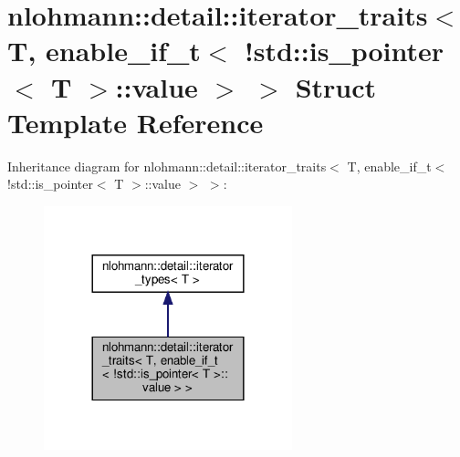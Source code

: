 \hypertarget{structnlohmann_1_1detail_1_1iterator__traits_3_01T_00_01enable__if__t_3_01_9std_1_1is__pointer_3_01T_01_4_1_1value_01_4_01_4}{}\section{nlohmann\+:\+:detail\+:\+:iterator\+\_\+traits$<$ T, enable\+\_\+if\+\_\+t$<$ !std\+:\+:is\+\_\+pointer$<$ T $>$\+:\+:value $>$ $>$ Struct Template Reference}
\label{structnlohmann_1_1detail_1_1iterator__traits_3_01T_00_01enable__if__t_3_01_9std_1_1is__pointer_3_01T_01_4_1_1value_01_4_01_4}


Inheritance diagram for nlohmann\+:\+:detail\+:\+:iterator\+\_\+traits$<$ T, enable\+\_\+if\+\_\+t$<$ !std\+:\+:is\+\_\+pointer$<$ T $>$\+:\+:value $>$ $>$\+:\nopagebreak
\begin{figure}[H]
\begin{center}
\leavevmode
\includegraphics[width=204pt]{structnlohmann_1_1detail_1_1iterator__traits_3_01T_00_01enable__if__t_3_01_9std_1_1is__pointer_31bae2175447e35a79f8ff22df87ddb2a}
\end{center}
\end{figure}


